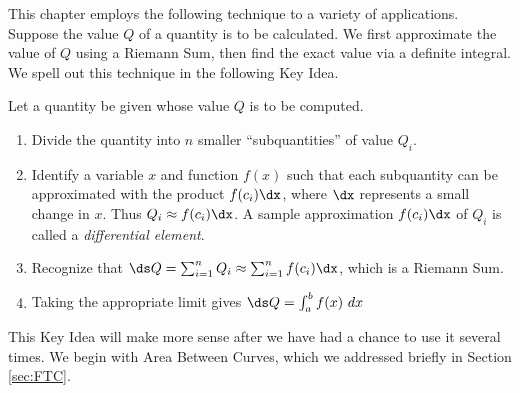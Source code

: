 This chapter employs the following technique to a variety of applications. Suppose the value $Q$ of a quantity is to be calculated. We first approximate the value of $Q$ using a Riemann Sum, then find the exact value via a definite integral. We spell out this technique in the following Key Idea.

{Let a quantity be given whose value $Q$ is to be computed.
\begin{enumerate}
\item		Divide the quantity into $n$ smaller ``subquantities'' of value $Q_i$.
\item		Identify a variable $x$ and function $f(x)$ such that each subquantity can be approximated with the product $f(c_i)\dx$, where $\dx$ represents a small change in $x$. Thus $Q_i \approx f(c_i)\dx$. A sample approximation $f(c_i)\dx$ of $Q_i$ is called a \textit{differential element}.
\item		Recognize that $\ds Q= \sum_{i=1}^n Q_i \approx \sum_{i=1}^n f(c_i)\dx$, which is a Riemann Sum.
\item		Taking the appropriate limit gives $\ds Q = \int_a^b f(x)\ dx$
\end{enumerate}}

This Key Idea will make more sense after we have had a chance to use it several times. We begin with Area Between Curves, which we addressed briefly in Section \ref{sec:FTC}.





%

%

